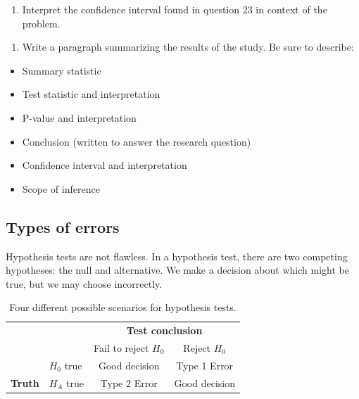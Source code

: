 \documentclass[
]{report}
\providecommand{\tightlist}{%
  \setlength{\itemsep}{0pt}\setlength{\parskip}{0pt}}
\begin{document}
\vspace{1in}

\begin{enumerate}
\def\labelenumi{\arabic{enumi}.}
\setcounter{enumi}{22}
\tightlist
\item
  Interpret the confidence interval found in question 23 in context of the problem.
\end{enumerate}

\vspace{1in}

\begin{enumerate}
\def\labelenumi{\arabic{enumi}.}
\setcounter{enumi}{23}
\tightlist
\item
  Write a paragraph summarizing the results of the study. Be sure to describe:
\end{enumerate}

\begin{itemize}
\item
  Summary statistic
\item
  Test statistic and interpretation
\item
  P-value and interpretation
\item
  Conclusion (written to answer the research question)
\item
  Confidence interval and interpretation
\item
  Scope of inference
\end{itemize}

\vspace{2in}

\hypertarget{types-of-errors}{%
\subsection*{Types of errors}\label{types-of-errors}}

Hypothesis tests are not flawless. In a hypothesis test, there are two competing hypotheses: the null and alternative. We make a decision about which might be true, but we may choose incorrectly.

\begin{table}
\caption{Four different possible scenarios for hypothesis tests.}
\centering
\begin{tabular}[h]{ll|cc}
\hline
 & &  \multicolumn{2}{c}{\textbf{Test conclusion}} \\
 &  & \multicolumn{1}{c}{Fail to reject $H_0$} & \multicolumn{1}{c}{Reject $H_0$}\\
\hline
 & $H_0$ true & Good decision & Type 1 Error\\
\hline
\textbf{Truth} & $H_A$ true & Type 2 Error & Good decision\\
\hline
\end{tabular}
\end{table}
\end{document}
